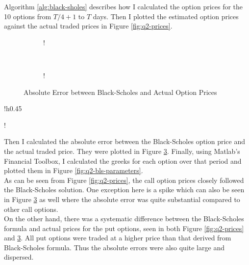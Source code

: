 \documentclass[11pt, fleqn]{article}
\begin{document}
Algorithm \ref{alg:black-sholes} describes how I calculated the option prices for the 10 options from $T/4 + 1$ to $T$ days. Then I plotted the estimated option prices against the actual traded prices in Figure \ref{fig:q2-prices}.

\begin{figure}[!h]
   \centering 
   \begin{subfigure}[b]{0.45\textwidth}
     	\resizebox {\textwidth} {!} { }
		\label{fig:q2-error}
    \end{subfigure}
    ~
    \begin{subfigure}[b]{0.45\textwidth}
       	\resizebox {\textwidth} {!} { }
        \label{fig:q2-error-boxplot}
    \end{subfigure}
	\vspace{-0.5cm}
    \caption{Absolute Error between Black-Scholes and Actual Option Prices}
	\label{fig:q2-error-both}
\end{figure}

\begin{wrapfigure}{!h}{0.45\textwidth}
\vspace{-1.5cm}
\begin{center}
	\resizebox {0.4\textwidth} {!} { }
	\caption{Black-Scholes Parameters}
	\label{fig:q2-bls-parameters}
	\vspace{-1cm}
\end{center}
\end{wrapfigure}

Then I calculated the absolute error between the Black-Scholes option price and the actual traded price. They were plotted in Figure \ref{fig:q2-error-both}. Finally, using Matlab's Financial Toolbox, I calculated the greeks for each option over that period and plotted them in Figure \ref{fig:q2-bls-parameters}.\\

As can be seen from Figure \ref{fig:q2-prices}, the call option prices closely followed the Black-Scholes solution. One exception here is a spike which can also be seen in Figure \ref{fig:q2-error-both} as well where the absolute error was quite substantial compared to other call options.\\

On the other hand, there was a systematic difference between the Black-Scholes formula and actual prices for the put options, seen in both Figure \ref{fig:q2-prices} and \ref{fig:q2-error-both}. All put options were traded at a higher price than that derived from Black-Scholes formula. Thus the absolute errors were also quite large and dispersed.\\
\end{document}
